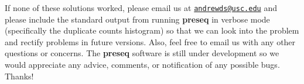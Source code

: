 \documentclass[11pt, titlepage]{article}
\newcounter{question}
\begin{document}
\vspace{5mm} If none of these solutions worked, please email us at
\href{mailto:andrewds@usc.edu}{\nolinkurl{andrewds@usc.edu}} and
please include the standard output from running \textbf{preseq} in
verbose mode (specifically the duplicate counts histogram) so that we
can look into the problem and rectify problems in future versions.
Also, feel free to email us with any other questions or concerns.  The
\textbf{preseq} software is still under development so we would
appreciate any advice, comments, or notification of any possible
bugs. Thanks!

\newpage



\end{document}
